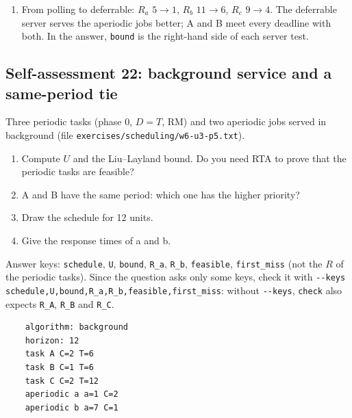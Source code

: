 \begin{enumerate}
    \textbf{Deferrable server.}
    \begin{itemize}
        \item The budget is \textbf{kept}: a runs on arrival, at 2, preempting B: $R_a = 3 - 2 = 1$.
        \item b gets 1 unit at 6 and 1 at 11: $R_b = 12 - 6 = 6$; c arrives at 13, after the budget of the period $[10, 15)$ was used, and runs at 16: $R_c = 17 - 13 = 4$.
    \end{itemize}
\begin{verbatim}
    time  0         10        20
        |.........|.........|....
    A     #....#....#....#....#....
    B     .#.##.......###......###.
    a     ..#......................
    b     ......#....#.............
    c     ................#........
    CPU   ABaBBAb...AbBBBAc...ABBB.
\end{verbatim}

\begin{verbatim}
    schedule=ABaBBAb...AbBBBAc...ABBB.
    U=0.500
    Us=0.200
    P=1.560
    bound=1.571
    Usmax=0.208
    R_a=1
    R_b=6
    R_c=4
    feasible=yes
    first_miss=none
\end{verbatim}
    \item From polling to deferrable: $R_a$ $5 \to 1$, $R_b$ $11 \to 6$, $R_c$ $9 \to 4$. The deferrable server serves the aperiodic jobs better; A and B meet every deadline with both. In the answer, \texttt{bound} is the right-hand side of each server test.
\end{enumerate}

\subsection*{Self-assessment 22: background service and a same-period tie}
Three periodic tasks (phase 0, $D = T$, RM) and two aperiodic jobs served in background (file \texttt{exercises/scheduling/w6-u3-p5.txt}).
\begin{enumerate}
    \item Compute $U$ and the Liu--Layland bound. Do you need RTA to prove that the periodic tasks are feasible?
    \item A and B have the same period: which one has the higher priority?
    \item Draw the schedule for 12 units.
    \item Give the response times of a and b.
\end{enumerate}

Answer keys: \texttt{schedule}, \texttt{U}, \texttt{bound}, \texttt{R\_a}, \texttt{R\_b}, \texttt{feasible}, \texttt{first\_miss} (not the $R$ of the periodic tasks). Since the question asks only some keys, check it with \texttt{-{}-keys schedule,U,bound,R\_a,R\_b,feasible,first\_miss}: without \texttt{-{}-keys}, \texttt{check} also expects \texttt{R\_A}, \texttt{R\_B} and \texttt{R\_C}.
\begin{lstlisting}
    algorithm: background
    horizon: 12
    task A C=2 T=6
    task B C=1 T=6
    task C C=2 T=12
    aperiodic a a=1 C=2
    aperiodic b a=7 C=1
\end{lstlisting}

